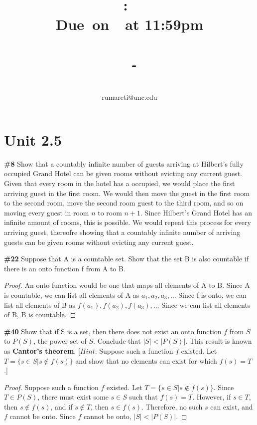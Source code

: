 \documentclass{article}
\title{
    \vspace{2in}
    \textmd{\textbf{\hmwkClass:\ \hmwkTitle}}\\
    \normalsize\vspace{0.1in}\small{\textbf{Due\ on\ \hmwkDueDate\ at 11:59pm}}\\
    \normalsize\text{Tuesday/Thursday 11:00-12:15, Phillips 383}\\
    \vspace{0.1in}\large{\textit{\hmwkClassInstructor\ - \hmwkClassTime}}
    \vspace{3in}
}
\author{\hmwkAuthorName\\\small{rumareti@unc.edu}}
\date{}
\newcommand{\unit}[1]{\section{Unit #1}}
\newcommand{\problem}[1]{\textbf{\##1}}
\newcommand{\prob}[1]{\problem{#1}}
\begin{document}
\maketitle

\pagebreak

\unit{2.5}
\prob{8}
Show that a countably inﬁnite number of guests arriving at Hilbert's fully occupied Grand Hotel can be given rooms without evicting any current guest.\\

Given that every room in the hotel has a occupied, we would place the first arriving guest in the first room. We would then move the guest in the first room to the second room, move the second room guest to the third room, and so on moving every guest in room \(n\) to room \(n+1\). Since Hilbert's Grand Hotel has an infinite amount of rooms, this is possible. We would repeat this process for every arriving guest, thereofre showing that a countably infinite number of arriving guests can be given rooms without evicting any current guest.

\pagebreak
\prob{22}
Suppose that A is a countable set. Show that the set B is also countable if there is an onto function f from A to B.\\

\begin{proof}
    An onto function would be one that maps all elements of A to B. Since A is countable, we can list all elements of A as \(a_1, a_2, a_3, \dots\) Since f is onto, we can list all elements of B as \(f(a_1), f(a_2), f(a_3), \dots\) Since we can list all elements of B, B is countable.
\end{proof}

\pagebreak
\prob{40}
Show that if S is a set, then there does not exist an onto function \(f\) from \(S\) to \(P(S)\), the power set of \(S\). Conclude that \(|S| < |P(S)|\). This result is known as \textbf{Cantor's theorem}. [\(Hint\): Suppose such a function \(f\) existed. Let \(T = \{s \in S | s \notin f (s)\}\) and show that no elements can exist for which \(f(s) = T\).]

\begin{proof}
    Suppose such a function \(f\) existed. Let \(T = \{s \in S | s \notin f (s)\}\). Since \(T \in P(S)\), there must exist some \(s \in S\) such that \(f(s) = T\). However, if \(s \in T\), then \(s \notin f(s)\), and if \(s \notin T\), then \(s \in f(s)\). Therefore, no such \(s\) can exist, and \(f\) cannot be onto. Since \(f\) cannot be onto, \(|S| < |P(S)|\).
\end{proof}
\end{document}
